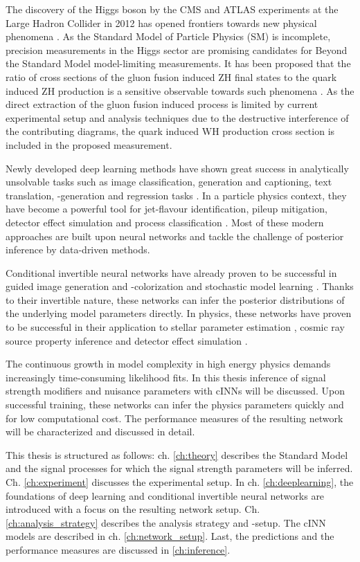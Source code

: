\label{sec:introduction}

The discovery of the Higgs boson by the CMS and ATLAS experiments at the Large Hadron Collider in 2012 has opened frontiers towards new physical phenomena \cite{Chatrchyan_2012}. As the Standard Model of Particle Physics (SM) is incomplete, precision measurements in the Higgs sector are promising candidates for Beyond the Standard Model model-limiting measurements. It has been proposed that the ratio of cross sections of the gluon fusion induced ZH final states to the quark induced ZH production is a sensitive observable towards such phenomena \cite{Harlander_2018}. As the direct extraction of the gluon fusion induced process is limited by current experimental setup and analysis techniques due to the destructive interference of the contributing diagrams, the quark induced WH production cross section is included in the proposed measurement.

Newly developed deep learning methods have shown great success in analytically unsolvable tasks such as image classification, generation and captioning, text translation, -generation and regression tasks \cite{LeCun2015}. In a particle physics context, they have become a powerful tool for jet-flavour identification, pileup mitigation, detector effect simulation and process classification \cite{Schwartz_2021}. Most of these modern approaches are built upon neural networks and tackle the challenge of posterior inference by data-driven methods.

Conditional invertible neural networks have already proven to be successful in guided image generation and -colorization \cite{cINN_im_gen} and stochastic model learning \cite{BayesFlow}. Thanks to their invertible nature, these networks can infer the posterior distributions of the underlying model parameters directly. In physics, these networks have proven to be successful in their application to stellar parameter estimation \cite{Ksoll_2020}, cosmic ray source property inference \cite{Bister_2022} and detector effect simulation \cite{Bellagente_2020}.

The continuous growth in model complexity in high energy physics demands increasingly time-consuming likelihood fits. In this thesis inference of signal strength modifiers and nuisance parameters with cINNs will be discussed. Upon successful training, these networks can infer the physics parameters quickly and for low computational cost. The performance measures of the resulting network will be characterized and discussed in detail.

This thesis is structured as follows: ch. \ref{ch:theory} describes the Standard Model and the signal processes for which the signal strength parameters will be inferred. Ch. \ref{ch:experiment} discusses the experimental setup. In ch. \ref{ch:deeplearning}, the foundations of deep learning and conditional invertible neural networks are introduced with a focus on the resulting network setup. Ch. \ref{ch:analysis_strategy} describes the analysis strategy and -setup. The cINN models are described in ch. \ref{ch:network_setup}. Last, the predictions and the performance measures are discussed in \ref{ch:inference}.